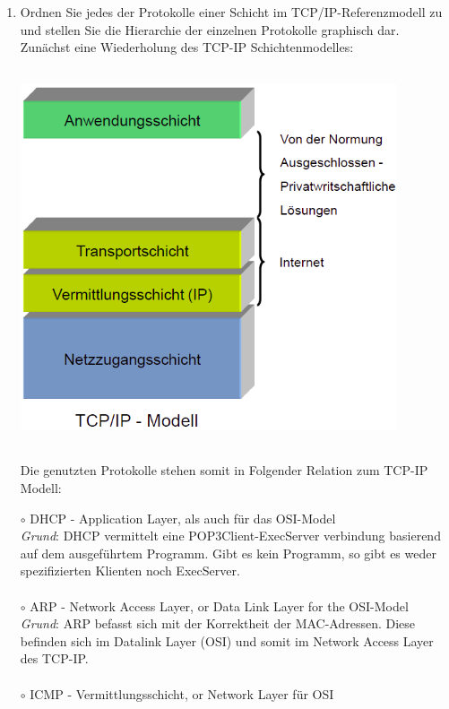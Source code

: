 \documentclass[11pt]{article}
\begin{document}
\begin{enumerate}[\thesection .1]
        \item Ordnen Sie jedes der Protokolle einer Schicht im TCP/IP-Referenzmodell zu und stellen Sie die Hierarchie der einzelnen Protokolle graphisch dar.\\
        Zunächst eine Wiederholung des TCP-IP Schichtenmodelles:
        \begin{center}
            \includegraphics[width=30em,height=30em]{TCP-IP-Modell.png}
        \end{center}
\pagebreak
        Die genutzten Protokolle stehen somit in Folgender Relation zum TCP-IP Modell:
        \begin{addmargin}[1em]{1em}
            $\circ$ DHCP - Application Layer, als auch für das OSI-Model\\
            \emph{Grund}: DHCP vermittelt eine POP3Client-ExecServer verbindung basierend auf dem ausgeführtem Programm.
            Gibt es kein Programm, so gibt es weder spezifizierten Klienten noch ExecServer.\\\\
            $\circ$ ARP - Network Access Layer, or Data Link Layer for the OSI-Model\\
            \emph{Grund}: ARP befasst sich mit der Korrektheit der MAC-Adressen. Diese befinden sich im Datalink Layer (OSI) und somit
            im Network Access Layer des TCP-IP.\\\\
            $\circ$ ICMP - Vermittlungsschicht, or Network Layer für OSI\\

\end{addmargin}
\end{enumerate}
\end{document}
